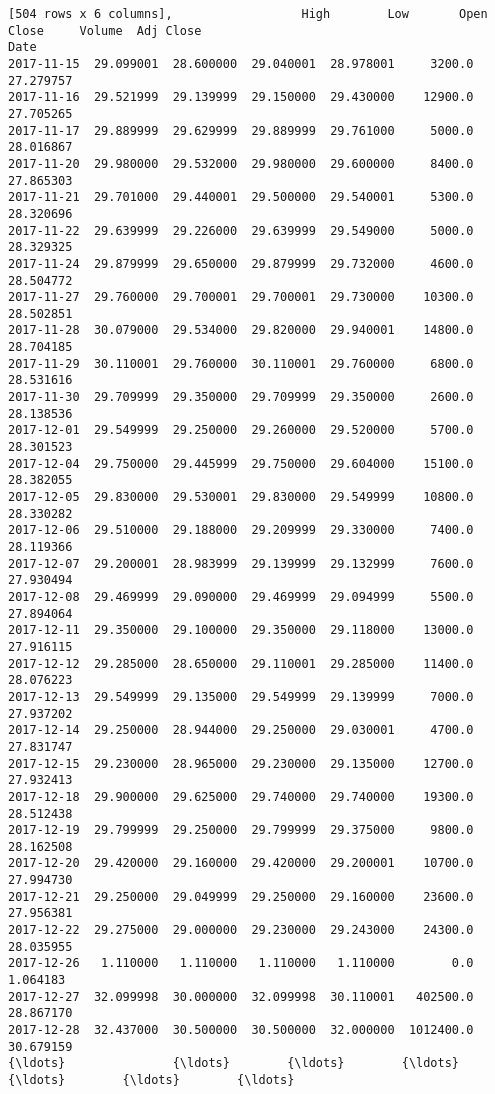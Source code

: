 \documentclass[11pt]{article}
\begin{document}
\begin{Verbatim}[commandchars=\\\{\}]
[504 rows x 6 columns],                  High        Low       Open      Close     Volume  Adj Close
Date                                                                        
2017-11-15  29.099001  28.600000  29.040001  28.978001     3200.0  27.279757
2017-11-16  29.521999  29.139999  29.150000  29.430000    12900.0  27.705265
2017-11-17  29.889999  29.629999  29.889999  29.761000     5000.0  28.016867
2017-11-20  29.980000  29.532000  29.980000  29.600000     8400.0  27.865303
2017-11-21  29.701000  29.440001  29.500000  29.540001     5300.0  28.320696
2017-11-22  29.639999  29.226000  29.639999  29.549000     5000.0  28.329325
2017-11-24  29.879999  29.650000  29.879999  29.732000     4600.0  28.504772
2017-11-27  29.760000  29.700001  29.700001  29.730000    10300.0  28.502851
2017-11-28  30.079000  29.534000  29.820000  29.940001    14800.0  28.704185
2017-11-29  30.110001  29.760000  30.110001  29.760000     6800.0  28.531616
2017-11-30  29.709999  29.350000  29.709999  29.350000     2600.0  28.138536
2017-12-01  29.549999  29.250000  29.260000  29.520000     5700.0  28.301523
2017-12-04  29.750000  29.445999  29.750000  29.604000    15100.0  28.382055
2017-12-05  29.830000  29.530001  29.830000  29.549999    10800.0  28.330282
2017-12-06  29.510000  29.188000  29.209999  29.330000     7400.0  28.119366
2017-12-07  29.200001  28.983999  29.139999  29.132999     7600.0  27.930494
2017-12-08  29.469999  29.090000  29.469999  29.094999     5500.0  27.894064
2017-12-11  29.350000  29.100000  29.350000  29.118000    13000.0  27.916115
2017-12-12  29.285000  28.650000  29.110001  29.285000    11400.0  28.076223
2017-12-13  29.549999  29.135000  29.549999  29.139999     7000.0  27.937202
2017-12-14  29.250000  28.944000  29.250000  29.030001     4700.0  27.831747
2017-12-15  29.230000  28.965000  29.230000  29.135000    12700.0  27.932413
2017-12-18  29.900000  29.625000  29.740000  29.740000    19300.0  28.512438
2017-12-19  29.799999  29.250000  29.799999  29.375000     9800.0  28.162508
2017-12-20  29.420000  29.160000  29.420000  29.200001    10700.0  27.994730
2017-12-21  29.250000  29.049999  29.250000  29.160000    23600.0  27.956381
2017-12-22  29.275000  29.000000  29.230000  29.243000    24300.0  28.035955
2017-12-26   1.110000   1.110000   1.110000   1.110000        0.0   1.064183
2017-12-27  32.099998  30.000000  32.099998  30.110001   402500.0  28.867170
2017-12-28  32.437000  30.500000  30.500000  32.000000  1012400.0  30.679159
{\ldots}               {\ldots}        {\ldots}        {\ldots}        {\ldots}        {\ldots}        {\ldots}

\end{Verbatim}
\end{document}
